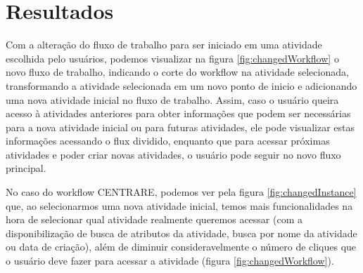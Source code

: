 \section{Resultados} \label{results}


Com a alteração do fluxo de trabalho para ser iniciado em uma atividade escolhida pelo usuários, podemos visualizar na figura \ref{fig:changedWorkflow} o novo fluxo de trabalho, indicando o corte do workflow na atividade selecionada, transformando a atividade selecionada em um novo ponto de inicio e adicionando uma nova atividade inicial no fluxo de trabalho. Assim, caso o usuário queira acesso à atividades anteriores para obter informações que podem ser necessárias para a nova atividade inicial ou para futuras atividades, ele pode visualizar estas informações acessando o flux dividido, enquanto que para acessar próximas atividades e poder criar novas atividades, o usuário pode seguir no novo fluxo principal.

No caso do workflow CENTRARE, podemos ver pela figura \ref{fig:changedInstance} que, ao selecionarmos uma nova atividade inicial, temos mais funcionalidades na hora de selecionar qual atividade realmente queremos acessar (com a disponibilização de busca de atributos da atividade, busca por nome da atividade ou data de criação), além de diminuir consideravelmente o número de cliques que o usuário deve fazer para acessar a atividade (figura \ref{fig:changedWorkflow}).

